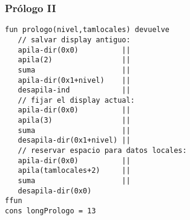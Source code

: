 \documentclass[hyperref={pdfpagelabels=false},tree-dvips,compress]{beamer}
\begin{document}
\begin{frame}[fragile]
\frametitle{Prólogo II}

\begin{lstlisting}[style=codigoMP,basicstyle=\scriptsize\ttfamily]
fun prologo(nivel,tamlocales) devuelve
   // salvar display antiguo:
   apila-dir(0x0)          ||
   apila(2)                ||
   suma                    ||
   apila-dir(0x1+nivel)    ||
   desapila-ind            ||
   // fijar el display actual:
   apila-dir(0x0)          ||
   apila(3)                ||
   suma                    ||
   desapila-dir(0x1+nivel) ||
   // reservar espacio para datos locales:
   apila-dir(0x0)          ||
   apila(tamlocales+2)     ||
   suma                    ||
   desapila-dir(0x0)
ffun
cons longPrologo = 13
\end{lstlisting}

\end{frame}
\end{document}
